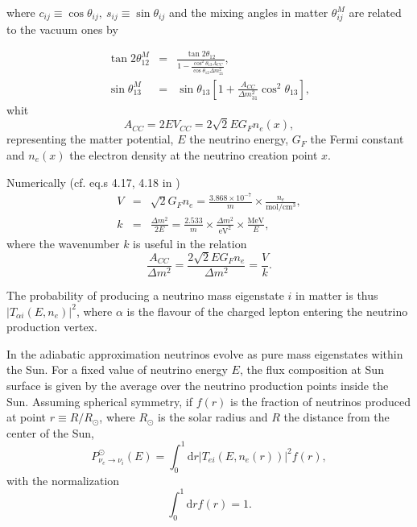 \documentclass[11pt,a4paper]{article}
\newcommand{\MeV}[0]{\text{MeV}}
\newcommand{\de}[0]{\text{d}}
\begin{document}
%	
	
where $c_{ij} \equiv \cos \theta_{ij},\ s_{ij} \equiv \sin \theta_{ij}$ and the mixing angles in matter $\theta_{ij}^M$ are related to the vacuum ones by

\begin{eqnarray}
	\tan 2 \theta_{12}^M &=& \frac{\tan 2 \theta_{12}}{1-\frac{\cos^2 \theta_{13} A_{CC}}{\cos \theta_{12} \Delta m^2_{21}} },\\
	\sin \theta_{13}^M &=& \sin \theta_{13} \left[1 + \frac{A_{CC}}{\Delta m^2_{31}} \cos^2\theta_{13}\right],
\end{eqnarray}
whit
\begin{equation}
	A_{CC} = 2 E V_{CC} = 2 \sqrt{2} E G_F n_e(x),
\end{equation}
representing the matter potential,  $E$ the neutrino energy, $G_F$ the Fermi constant and $n_e(x)$ the electron density at the neutrino creation point $x$.

Numerically (cf. eq.s 4.17, 4.18 in \cite{Fantini:2018itu})
\begin{eqnarray}
	V &=& \sqrt{2} G_F n_e = \frac{3.868 \times 10^{-7}}{m} \times \frac{n_e}{\text{mol}/\text{cm}^3},\\
	k &=& \frac{\Delta m^2}{2 E} = \frac{2.533}{m} \times \frac{\Delta m^2}{\text{eV}^2} \times \frac{\MeV}{E},
\end{eqnarray}
where the wavenumber $k$ is useful in the relation
\begin{equation}
	\frac{A_{CC}}{\Delta m^2} = \frac{2 \sqrt{2} E G_F n_e}{\Delta m^2} = \frac{V}{k}.
\end{equation}

The probability of producing a neutrino mass eigenstate $i$ in matter is thus $\left| T_{\alpha i}\left( E, n_e \right)\right|^2$, where $\alpha$ is the flavour of the charged lepton entering the neutrino production vertex.

In the adiabatic approximation neutrinos evolve as pure mass eigenstates within the Sun. For a fixed value of neutrino energy $E$, the flux composition  at Sun surface is given by the average over the neutrino production points inside the Sun. Assuming spherical symmetry, if $f(r)$ is the fraction of neutrinos produced at point $r \equiv R/R_\odot$, where $R_\odot$ is the solar radius and $R$ the distance from the center of the Sun, 
\begin{equation}
	P_{\nu_e \rightarrow \nu_i}^\odot(E) = \int_0^1 \de r \left| T_{e i}\left( E, n_e(r) \right)\right|^2 f(r),
\end{equation}
with the normalization
\begin{equation}
	\int_0^1 \de r f(r) = 1.
\end{equation}
\end{document}
